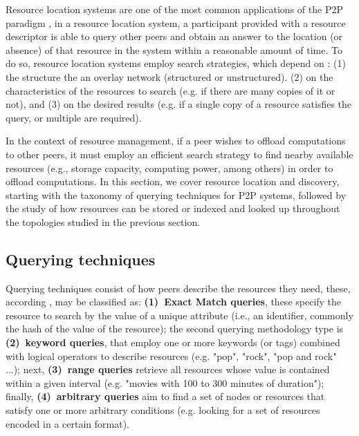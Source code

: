 

Resource location systems are one of the most common applications of the P2P paradigm \cite{leitaoPHDthesis}, in a resource location system, a participant provided with a resource descriptor is able to query other peers and obtain an answer to the location (or absence) of that resource in the system within a reasonable amount of time. To do so, resource location systems employ search strategies, which depend on : (1) the structure the an overlay network (structured or unstructured). (2) on the characteristics of the resources to search (e.g. if there are many copies of it or not), and (3) on the desired results (e.g. if a single copy of a resource satisfies the query, or multiple are required). 

In the context of resource management, if a peer wishes to offload computations to other peers, it must employ an efficient search strategy to find nearby available resources (e.g., storage capacity, computing power, among others) in order to offload computations. In this section, we cover resource location and discovery, starting with the taxonomy of querying techniques for P2P systems, followed by the study of how resources can be stored or indexed and looked up throughout the topologies studied in the previous section.

\subsection{Querying techniques}

Querying techniques consist of how peers describe the resources they need, these, according \cite{leitaoPHDthesis}, may be classified as: \textbf{(1)~Exact Match queries}, these specify the resource to search by the value of a unique attribute (i.e., an identifier, commonly the hash of the value of the resource); the second querying methodology type is \textbf{(2)~keyword queries}, that employ one or more keywords (or tags) combined with logical operators to describe resources (e.g. "pop", "rock", "pop and rock" ...); next, \textbf{(3)~range queries} retrieve all resources whose value is contained within a given interval (e.g. "movies with 100 to 300 minutes of duration"); finally, \textbf{(4)~arbitrary queries} aim to find a set of nodes or resources that satisfy one or more arbitrary conditions (e.g. looking for a set of resources encoded in a certain format).

